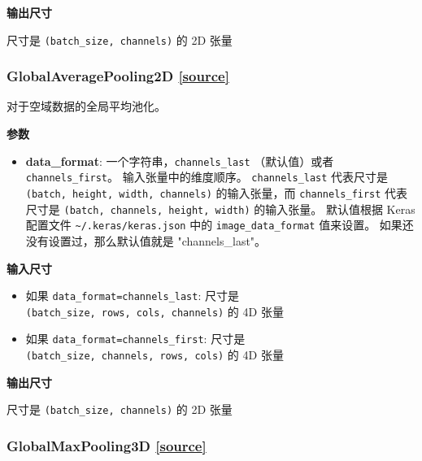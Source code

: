 \textbf{输出尺寸}

尺寸是 \texttt{(batch\_size,\ channels)} 的 2D 张量


\subsubsection{GlobalAveragePooling2D {\href{https://github.com/keras-team/keras/blob/master/keras/layers/pooling.py\#L510}{{[}source{]}}}}

\begin{Shaded}
\begin{Highlighting}[]
\OperatorTok{=}\NormalTok{)}
\end{Highlighting}
\end{Shaded}

对于空域数据的全局平均池化。

\textbf{参数}

\begin{itemize}
\tightlist
\item
  \textbf{data\_format}: 一个字符串，\texttt{channels\_last}
  （默认值）或者 \texttt{channels\_first}。 输入张量中的维度顺序。
  \texttt{channels\_last} 代表尺寸是
  \texttt{(batch,\ height,\ width,\ channels)} 的输入张量，而
  \texttt{channels\_first} 代表尺寸是
  \texttt{(batch,\ channels,\ height,\ width)} 的输入张量。 默认值根据
  Keras 配置文件 \texttt{\textasciitilde{}/.keras/keras.json} 中的
  \texttt{image\_data\_format} 值来设置。
  如果还没有设置过，那么默认值就是 "channels\_last"。
\end{itemize}

\textbf{输入尺寸}

\begin{itemize}
\tightlist
\item
  如果
  \texttt{data\_format=\textquotesingle{}channels\_last\textquotesingle{}}:
  尺寸是 \texttt{(batch\_size,\ rows,\ cols,\ channels)} 的 4D 张量
\item
  如果
  \texttt{data\_format=\textquotesingle{}channels\_first\textquotesingle{}}:
  尺寸是 \texttt{(batch\_size,\ channels,\ rows,\ cols)} 的 4D 张量
\end{itemize}

\textbf{输出尺寸}

尺寸是 \texttt{(batch\_size,\ channels)} 的 2D 张量




\subsubsection{GlobalMaxPooling3D {\href{https://github.com/keras-team/keras/blob/master/keras/layers/pooling.py\#L639}{{[}source{]}}}}


